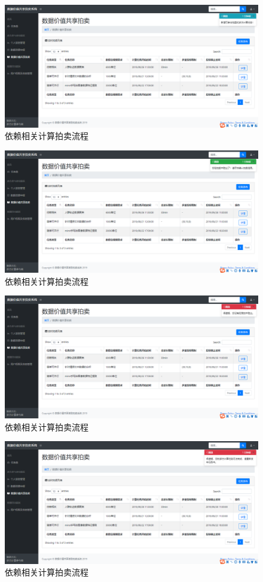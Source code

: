 \documentclass[promaster]{thesis-uestc}
\begin{document}
\begin{figure}[H]
    \includegraphics[width=400pt]{ui/xinzengkecanyu.png}
    \caption{依赖相关计算拍卖流程}
\end{figure}
\begin{figure}[H]
    \includegraphics[width=400pt]{ui/xinzengshengchu.png}
    \caption{依赖相关计算拍卖流程}
\end{figure}
\begin{figure}[H]
    \includegraphics[width=400pt]{ui/xinzengshibai.png}
    \caption{依赖相关计算拍卖流程}
\end{figure}
\begin{figure}[H]
    \includegraphics[width=400pt]{ui/xinzengrenwushibai.png}
    \caption{依赖相关计算拍卖流程}
\end{figure}
\end{document}
